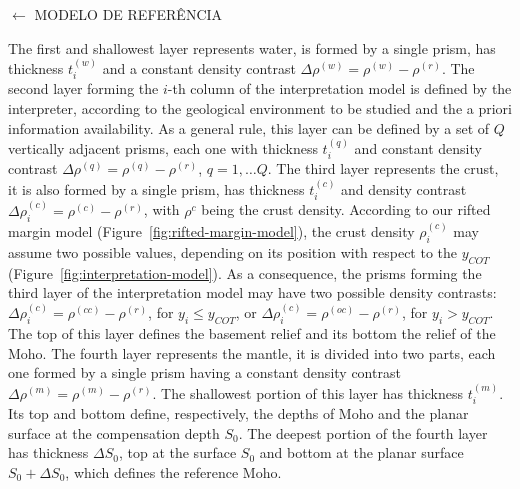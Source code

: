 \documentclass[manuscript]{geophysics}
\begin{document}
$\leftarrow$ MODELO DE REFERÊNCIA

The first and shallowest layer represents water, 
is formed by a single prism, has thickness $t^{(w)}_{i}$ and a constant density
contrast $\Delta \rho^{(w)} = \rho^{(w)} - \rho^{(r)}$.
The second layer forming the $i$-th column of the interpretation model is defined by
the interpreter, according to the geological environment to be studied and the a priori
information availability. 
As a general rule, this layer can be defined by a set of $Q$ vertically adjacent
prisms, each one with thickness $t^{(q)}_{i}$ and constant density contrast
$\Delta \rho^{(q)} = \rho^{(q)} - \rho^{(r)}$, $q = 1, \dots Q$.
The third layer represents the crust, it is also formed by a single prism,
has thickness $t^{(c)}_{i}$ and density contrast 
$\Delta \rho^{(c)}_{i} = \rho^{(c)} - \rho^{(r)}$, 
with $\rho^{c}$ being the crust density. 
According to our rifted margin model (Figure~\ref{fig:rifted-margin-model}), the crust
density $\rho^{(c)}_{i}$ may assume two possible values, depending on its position
with respect to the $y_{COT}$ (Figure~\ref{fig:interpretation-model}).
As a consequence, the prisms forming the third layer of the interpretation model may
have two possible density contrasts: $\Delta \rho^{(c)}_{i} = \rho^{(cc)} - \rho^{(r)}$,
for $y_{i} \le y_{COT}$, or $\Delta \rho^{(c)}_{i} = \rho^{(oc)} - \rho^{(r)}$,
for $y_{i} > y_{COT}$. 
The top of this layer defines the basement relief and its bottom the relief of the
Moho. 
The fourth layer represents the mantle, it is divided into two parts, each one formed
by a single prism having a constant density contrast 
$\Delta \rho^{(m)} = \rho^{(m)} - \rho^{(r)}$. The shallowest
portion of this layer has thickness $t^{(m)}_{i}$. Its top and bottom define,
respectively, the depths of Moho and the planar surface at the compensation depth $S_{0}$.
The deepest portion of the fourth layer has thickness $\Delta S_{0}$, top at the
surface $S_{0}$ and bottom at the planar surface 
$S_{0} + \Delta S_{0}$, which defines the reference Moho. 
\end{document}
